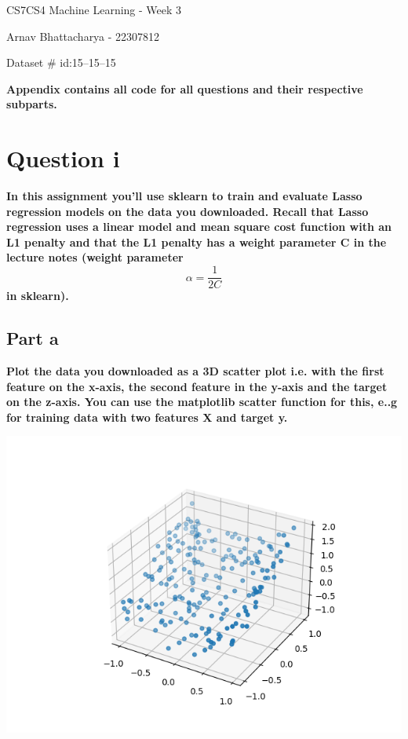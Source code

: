 \documentclass[10pt]{article}
\begin{document}
{\centering
CS7CS4 Machine Learning - Week 3
\par
Arnav Bhattacharya - 22307812
\par
Dataset \# id:15--15--15
\par
}
\vspace{5mm}
\begin{center}
  \textbf{Appendix contains all code for all questions and their respective subparts.}
\end{center}

\section*{Question i}
\textbf{In this assignment you'll use sklearn to train and evaluate Lasso regression models on the
  data you downloaded. Recall that Lasso regression uses a linear model and mean square
  cost function with an L1 penalty and that the L1 penalty has a weight parameter C in the
  lecture notes (weight parameter {\begin{equation*} \alpha = \dfrac {1}{2C} \end{equation*}} in sklearn).}

\subsection*{Part a}
\textbf{Plot the data you downloaded as a 3D scatter plot i.e. with the first feature on
  the x-axis, the second feature in the y-axis and the target on the z-axis. You
  can use the matplotlib scatter function for this, e..g for training data with two
  features X and target y.
}

\begin{center}
  \includegraphics[scale=0.4]{./images/Figure_1.png}
\end{center}
\end{document}
